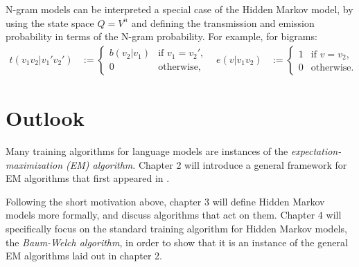N-gram models can be interpreted a special case of the Hidden Markov model, by
using the state space $Q = V^n$ and defining the transmission and emission
probability in terms of the N-gram probability. For example, for bigrams:
\begin{align*}
 t(v_1v_2|v_1'v_2') &:= \begin{cases}
  b(v_2|v_1) & \text{if } v_1 = v_2', \\
  0 &\text{otherwise},
 \end{cases} &
 e(v|v_1v_2) &:= \begin{cases}
  1 & \text{if } v = v_2, \\
  0 &\text{otherwise}.
 \end{cases}
\end{align*}

\section{Outlook}

Many training algorithms for language models are instances of the
\emph{expectation-maximization (EM) algorithm}. \cite{demlairub77} Chapter 2
will introduce a general framework for EM algorithms that first appeared in
\cite{bucstuvog15}.

Following the short motivation above, chapter 3 will define Hidden Markov
models more formally, and discuss algorithms that act on them. Chapter 4 will
specifically focus on the standard training algorithm for Hidden Markov models,
the \emph{Baum-Welch algorithm}, in order to show that it is an instance of the
general EM algorithms laid out in chapter 2.
